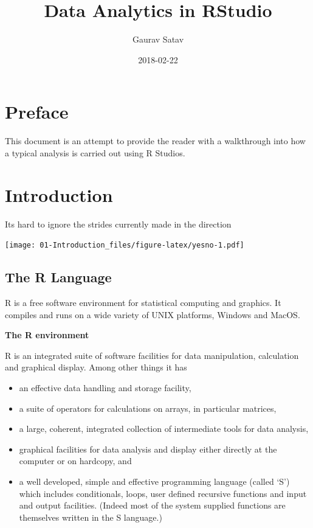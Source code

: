 \documentclass[]{book}
\title{Data Analytics in RStudio}
\author{Gaurav Satav}
\date{2018-02-22}
\providecommand{\tightlist}{%
  \setlength{\itemsep}{0pt}\setlength{\parskip}{0pt}}
\theoremstyle{definition}
\theoremstyle{definition}
\theoremstyle{definition}
\theoremstyle{remark}
\begin{document}
\maketitle

{
\setcounter{tocdepth}{1}
\tableofcontents
}
\chapter*{Preface}\label{preface}

This document is an attempt to provide the reader with a walkthrough
into how a typical analysis is carried out using R Studios.

\chapter{Introduction}\label{introduction}

Its hard to ignore the strides currently made in the direction

\texttt{[image: 01-Introduction\_files/figure-latex/yesno-1.pdf]}

\section{The R Language}\label{the-r-language}

R is a free software environment for statistical computing and graphics.
It compiles and runs on a wide variety of UNIX platforms, Windows and
MacOS.

\textbf{The R environment}

R is an integrated suite of software facilities for data manipulation,
calculation and graphical display. Among other things it has

\begin{itemize}
\tightlist
\item
  an effective data handling and storage facility,
\item
  a suite of operators for calculations on arrays, in particular
  matrices,
\item
  a large, coherent, integrated collection of intermediate tools for
  data analysis,
\item
  graphical facilities for data analysis and display either directly at
  the computer or on hardcopy, and
\item
  a well developed, simple and effective programming language (called
  `S') which includes conditionals, loops, user defined recursive
  functions and input and output facilities. (Indeed most of the system
  supplied functions are themselves written in the S language.)
\end{itemize}
\end{document}
